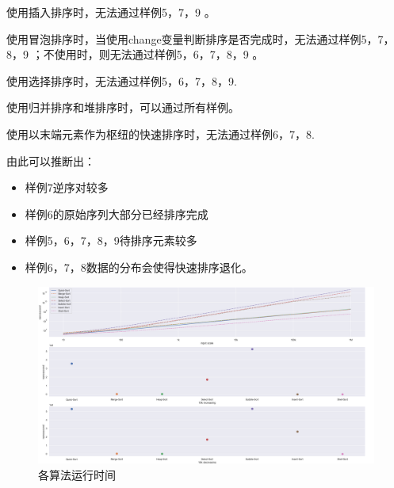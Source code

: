 使用插入排序时，无法通过样例5，7，9 。

使用冒泡排序时，当使用change变量判断排序是否完成时，无法通过样例5，7，8，9 ；不使用时，则无法通过样例5，6，7，8，9 。

使用选择排序时，无法通过样例5，6，7，8，9.

使用归并排序和堆排序时，可以通过所有样例。

使用以末端元素作为枢纽的快速排序时，无法通过样例6，7，8.

由此可以推断出：
\begin{itemize}
    \item 样例7逆序对较多 
    \item 样例6的原始序列大部分已经排序完成
    \item 样例5，6，7，8，9待排序元素较多
    \item 样例6，7，8数据的分布会使得快速排序退化。
\end{itemize}
\begin{figure}
    \centering
    \includegraphics[width=\textwidth]{fig1.png}
    \caption{各算法运行时间}
\end{figure}
